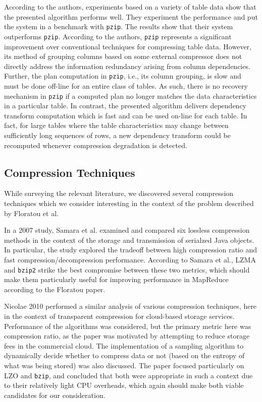 \documentclass[twocolumn]{article}
\begin{document}
According to the authors, experiments based on a variety of table data show that the presented
algorithm performs well. They experiment the performance and put the system in a benchmark
with \verb+pzip+. The results show that their system outperforms \verb+pzip+. According to the
authors, \verb+pzip+ represents a significant improvement over conventional techniques for
compressing table data. However, its method of grouping columns based on
some external compressor does not directly address the information redundancy arising from column
dependencies. Further, the plan computation in \verb+pzip+, i.e., its column grouping, is slow and must be
done off-line for an entire class of tables. As such, there is no recovery mechanism in \verb+pzip+ if a
computed plan no longer matches the data characteristics in a particular table. In contrast, the
presented algorithm delivers dependency transform computation which is fast and can be used on-line
for each table. In fact, for large tables where the table characteristics may change between
sufficiently long sequences of rows, a new dependency transform could be recomputed
whenever compression degradation is detected.

\subsection{Compression Techniques}

While surveying the relevant literature, we discovered several
compression techniques which we consider interesting in the context
of the problem described by Floratou et al.

In a 2007 study, Samara et al. \cite{ref:comp-study} examined and compared
six lossless compression methods in the context of the storage and
transmission of serialzed Java objects.  In particular, the study
explored the tradeoff between high compression
ratio and fast compression/decompression performance.  According to Samara
et al., LZMA and \verb+bzip2+ strike the best compromise between these
two metrics, which should make them particularly useful for improving
performance in MapReduce according to the Floratou paper.

Nicolae 2010 \cite{ref:cloud-comp} performed a similar analysis of various
compression techniques, here in the context of transparent compression
for cloud-based storage services.  Performance of the algorithms
was considered, but the primary metric here was compression ratio, as the
paper was motivated by attempting to reduce storage fees in the commercial
cloud.  The implementation of a sampling algorithm to dynamically decide whether
to compress data or not (based on the entropy of what was being stored) was also
discussed.  The paper focused particularly on LZO and \verb+bzip+,
and concluded that both were appropriate in such a context due to their
relatively light CPU overheads, which again should make both viable candidates
for our consideration.
\end{document}
